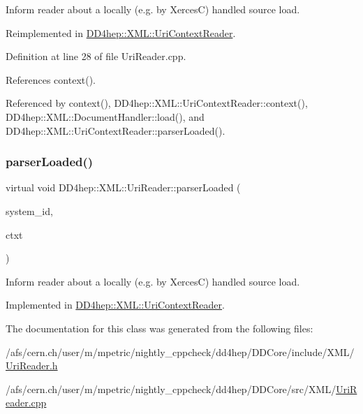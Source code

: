 Inform reader about a locally (e.\+g. by XercesC) handled source load. 



Reimplemented in \hyperlink{class_d_d4hep_1_1_x_m_l_1_1_uri_context_reader_ae3ec9a7f4f18adf4dcac1d894453dbd0}{D\+D4hep\+::\+X\+M\+L\+::\+Uri\+Context\+Reader}.



Definition at line 28 of file Uri\+Reader.\+cpp.



References context().



Referenced by context(), D\+D4hep\+::\+X\+M\+L\+::\+Uri\+Context\+Reader\+::context(), D\+D4hep\+::\+X\+M\+L\+::\+Document\+Handler\+::load(), and D\+D4hep\+::\+X\+M\+L\+::\+Uri\+Context\+Reader\+::parser\+Loaded().

\hypertarget{class_d_d4hep_1_1_x_m_l_1_1_uri_reader_ad04589fb5da7fe238c1a0cf1c8e4f0ac}{}\label{class_d_d4hep_1_1_x_m_l_1_1_uri_reader_ad04589fb5da7fe238c1a0cf1c8e4f0ac} 
\subsubsection{\texorpdfstring{parser\+Loaded()}{parserLoaded()}\hspace{0.1cm}{\footnotesize\ttfamily [2/2]}}
{\footnotesize\ttfamily virtual void D\+D4hep\+::\+X\+M\+L\+::\+Uri\+Reader\+::parser\+Loaded (\begin{DoxyParamCaption}\item[{const std\+::string \&}]{system\+\_\+id,  }\item[{\hyperlink{struct_d_d4hep_1_1_x_m_l_1_1_uri_reader_1_1_user_context}{User\+Context} $\ast$}]{ctxt }\end{DoxyParamCaption})\hspace{0.3cm}{\ttfamily [pure virtual]}}



Inform reader about a locally (e.\+g. by XercesC) handled source load. 



Implemented in \hyperlink{class_d_d4hep_1_1_x_m_l_1_1_uri_context_reader_ad55127447ec6782a4bf610ea2a33e233}{D\+D4hep\+::\+X\+M\+L\+::\+Uri\+Context\+Reader}.



The documentation for this class was generated from the following files\+:\begin{DoxyCompactItemize}
\item 
/afs/cern.\+ch/user/m/mpetric/nightly\+\_\+cppcheck/dd4hep/\+D\+D\+Core/include/\+X\+M\+L/\hyperlink{_uri_reader_8h}{Uri\+Reader.\+h}\item 
/afs/cern.\+ch/user/m/mpetric/nightly\+\_\+cppcheck/dd4hep/\+D\+D\+Core/src/\+X\+M\+L/\hyperlink{_uri_reader_8cpp}{Uri\+Reader.\+cpp}\end{DoxyCompactItemize}
